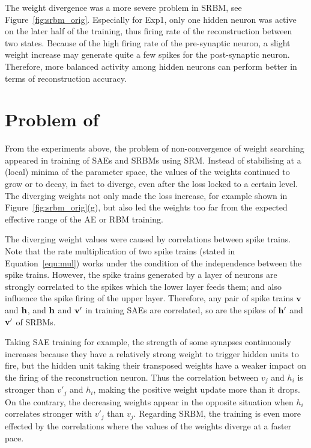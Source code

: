 The weight divergence was a more severe problem in \DIFaddbegin {}\DIFaddend SRBM, see Figure~\ref{fig:srbm_orig}.
Especially for Exp1, only one hidden neuron was active on the later half of the training, thus \DIFdelbegin {}\DIFdelend \DIFaddbegin {}\DIFaddend firing rate of the reconstruction \DIFdelbegin {}\DIFdelend \DIFaddbegin {}\DIFaddend between two states.
Because of the high firing rate of the pre-synaptic neuron, a slight weight increase may generate quite a few spikes for the post-synaptic neuron.
Therefore, more balanced activity among hidden neurons can perform better in terms of reconstruction accuracy.

\section{Problem of \DIFdelbegin {}\DIFdelend \DIFaddbegin {}\DIFaddend }
\label{sec:problem}
From the experiments above, the problem of non-convergence of weight searching appeared in training of SAEs and SRBMs using SRM.
Instead of stabilising at a (local) minima of the parameter space, the values of the weights continued to grow or to decay, in fact to diverge, even after the loss locked to a certain level.
The diverging weights not only made the loss increase, for example \DIFaddbegin {}\DIFaddend shown in Figure~\ref{fig:srbm_orig}(g), but also led the weights too far from the expected effective range of the AE or RBM training.

The diverging weight values were caused by \DIFdelbegin {}\DIFdelend correlations between spike trains.
Note that the rate multiplication of two spike trains (stated in Equation~\ref{equ:mul}) works under the condition of the independence between the spike trains.
However, the spike trains generated by a layer of neurons are strongly correlated to the spikes which the lower layer feeds them; and also influence the spike firing of the upper layer.
Therefore, any pair of spike trains $\bf{v}$ and $\bf{h}$, and $\bf{h}$ and $\bf{v'}$ in training SAEs are correlated, so are the spikes of $\bf{h'}$ and $\bf{v'}$ of SRBMs.


Taking SAE training for example, the strength of some synapses continuously increases because they have a relatively strong weight to trigger hidden units to fire, but the hidden unit taking their transposed weights have a weaker impact on the firing of the reconstruction neuron.
Thus the correlation between $v_j$ and $h_i$ is stronger than $v'_j$ and $h_i$, making the positive weight update more \DIFdelbegin {}\DIFdelend \DIFaddbegin {}\DIFaddend than it drops.
On the contrary, the decreasing weights appear in the opposite situation when $h_i$ correlates stronger with $v'_j$ than $v_j$.
Regarding \DIFdelbegin {}\DIFdelend \DIFaddbegin {}\DIFaddend SRBM, the training is even more effected by the correlations where the values of the weights diverge at a faster pace.

